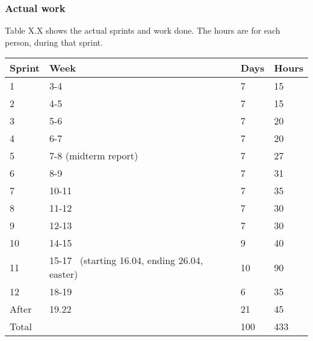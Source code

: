 \subsubsection{Actual work}
Table X.X shows the actual sprints and work done. The hours are for each
person, during that sprint.
\begin{tabular}{|l|l|l|l|}
\hline
 Sprint & Week & Days & Hours \\\hline
 1 & 3-4 & 7 & 15\\\hline
 2 & 4-5  & 7  & 15\\\hline
 3 & 5-6 & 7  & 20\\\hline
 4 & 6-7 & 7 & 20\\\hline
 5 & 7-8 (midterm report) & 7 & 27\\\hline
 6 & 8-9  & 7  & 31\\\hline
 7 & 10-11 & 7  & 35\\\hline
 8 & 11-12 & 7 & 30\\\hline
 9 & 12-13 & 7  & 30\\\hline
 10 & 14-15 & 9 & 40\\\hline
 11 & 15-17 \ (starting 16.04, ending 26.04, easter) & 10 & 90\\\hline
 12 & 18-19 & 6 & 35\\\hline
 After & 19.22 & 21 & 45\\\hline
 Total & & 100 & 433\\\hline
\end{tabular}

